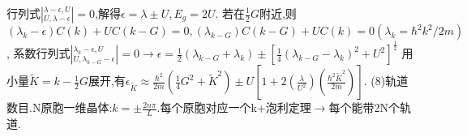 \documentclass[UTF8,a4paper,3pt,twocolumn]{ctexart}
\begin{document}
\begin{itemize}
  行列式$|^{\lambda-\epsilon,U}_{U,\lambda-\epsilon}|=0$,解得$\epsilon=\lambda\pm U,E_g=2U$.
  若在$\frac{1}{2}G$附近,则$(\lambda_k-\epsilon)C(k)+UC(k-G)=0,(\lambda_{k-G})C(k-G)+UC(k)=0(\lambda_k=\hbar^2k^2/2m)$,
  系数行列式$|^{\lambda_k-\epsilon,U}_{U,\lambda_{k-G}-\epsilon}|=0\rightarrow\epsilon=\frac{1}{2}(\lambda_{k-G}+\lambda_k)\pm[\frac{1}{4}(\lambda_{k-G}-\lambda_k)^2+U^2]^\frac{1}{2}$
  用小量$\widetilde{K}=k-\frac{1}{2}G$展开,有$\epsilon_{\widetilde{K}}\approx\frac{\hbar^2}{2m}(\frac{1}{4}G^2+\widetilde{K}^2)\pm U[1+2(\frac{\lambda}{U^2})(\frac{\hbar^2\widetilde{K}^2}{2m})]$.
  (8)轨道数目.N原胞一维晶体:$k=\pm\frac{2n\pi}{L}$.每个原胞对应一个k+泡利定理$\rightarrow$每个能带2N个轨道.

\end{itemize}

\end{document}
